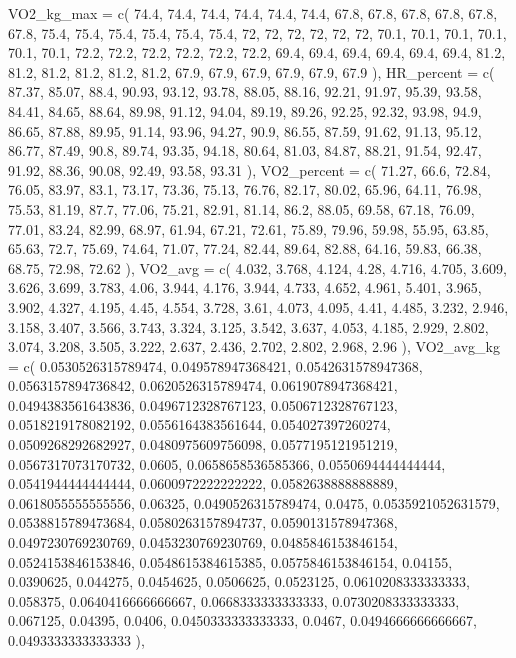 \documentclass[
  letterpaper,
  DIV=11]{scrartcl}
\newenvironment{Shaded}{\begin{snugshade}}{\end{snugshade}}
\newcommand{\NormalTok}[1]{\textcolor[rgb]{0.00,0.23,0.31}{#1}}
\begin{document}
\begin{Shaded}
\begin{Highlighting}[]
\NormalTok{  \textasciigrave{}VO2\_kg\_max\textasciigrave{} = c( 74.4, 74.4, 74.4, 74.4, 74.4, 74.4, 67.8, 67.8, 67.8, 67.8, 67.8, 67.8, 75.4, 75.4, 75.4, 75.4, 75.4, 75.4, 72, 72, 72, 72, 72, 72, 70.1, 70.1, 70.1, 70.1, 70.1, 70.1, 72.2, 72.2, 72.2, 72.2, 72.2, 72.2, 69.4, 69.4, 69.4, 69.4, 69.4, 69.4, 81.2, 81.2, 81.2, 81.2, 81.2, 81.2, 67.9, 67.9, 67.9, 67.9, 67.9, 67.9 ),}
\NormalTok{  \textasciigrave{}HR\_percent\textasciigrave{} = c( 87.37, 85.07, 88.4, 90.93, 93.12, 93.78, 88.05, 88.16, 92.21, 91.97, 95.39, 93.58, 84.41, 84.65, 88.64, 89.98, 91.12, 94.04, 89.19, 89.26, 92.25, 92.32, 93.98, 94.9, 86.65, 87.88, 89.95, 91.14, 93.96, 94.27, 90.9, 86.55, 87.59, 91.62, 91.13, 95.12, 86.77, 87.49, 90.8, 89.74, 93.35, 94.18, 80.64, 81.03, 84.87, 88.21, 91.54, 92.47, 91.92, 88.36, 90.08, 92.49, 93.58, 93.31 ),}
\NormalTok{  \textasciigrave{}VO2\_percent\textasciigrave{} = c( 71.27, 66.6, 72.84, 76.05, 83.97, 83.1, 73.17, 73.36, 75.13, 76.76, 82.17, 80.02, 65.96, 64.11, 76.98, 75.53, 81.19, 87.7, 77.06, 75.21, 82.91, 81.14, 86.2, 88.05, 69.58, 67.18, 76.09, 77.01, 83.24, 82.99, 68.97, 61.94, 67.21, 72.61, 75.89, 79.96, 59.98, 55.95, 63.85, 65.63, 72.7, 75.69, 74.64, 71.07, 77.24, 82.44, 89.64, 82.88, 64.16, 59.83, 66.38, 68.75, 72.98, 72.62 ),}
\NormalTok{  \textasciigrave{}VO2\_avg\textasciigrave{} = c( 4.032, 3.768, 4.124, 4.28, 4.716, 4.705, 3.609, 3.626, 3.699, 3.783, 4.06, 3.944, 4.176, 3.944, 4.733, 4.652, 4.961, 5.401, 3.965, 3.902, 4.327, 4.195, 4.45, 4.554, 3.728, 3.61, 4.073, 4.095, 4.41, 4.485, 3.232, 2.946, 3.158, 3.407, 3.566, 3.743, 3.324, 3.125, 3.542, 3.637, 4.053, 4.185, 2.929, 2.802, 3.074, 3.208, 3.505, 3.222, 2.637, 2.436, 2.702, 2.802, 2.968, 2.96 ),}
\NormalTok{  \textasciigrave{}VO2\_avg\_kg\textasciigrave{} = c( 0.0530526315789474, 0.049578947368421, 0.0542631578947368, 0.0563157894736842, 0.0620526315789474, 0.0619078947368421, 0.0494383561643836, 0.0496712328767123, 0.0506712328767123, 0.0518219178082192, 0.0556164383561644, 0.054027397260274, 0.0509268292682927, 0.0480975609756098, 0.0577195121951219, 0.0567317073170732, 0.0605, 0.0658658536585366, 0.0550694444444444, 0.0541944444444444, 0.0600972222222222, 0.0582638888888889, 0.0618055555555556, 0.06325, 0.0490526315789474, 0.0475, 0.0535921052631579, 0.0538815789473684, 0.0580263157894737, 0.0590131578947368, 0.0497230769230769, 0.0453230769230769, 0.0485846153846154, 0.0524153846153846, 0.0548615384615385, 0.0575846153846154, 0.04155, 0.0390625, 0.044275, 0.0454625, 0.0506625, 0.0523125, 0.0610208333333333, 0.058375, 0.0640416666666667, 0.0668333333333333, 0.0730208333333333, 0.067125, 0.04395, 0.0406, 0.0450333333333333, 0.0467, 0.0494666666666667, 0.0493333333333333 ),}

\end{Highlighting}
\end{Shaded}
\end{document}
